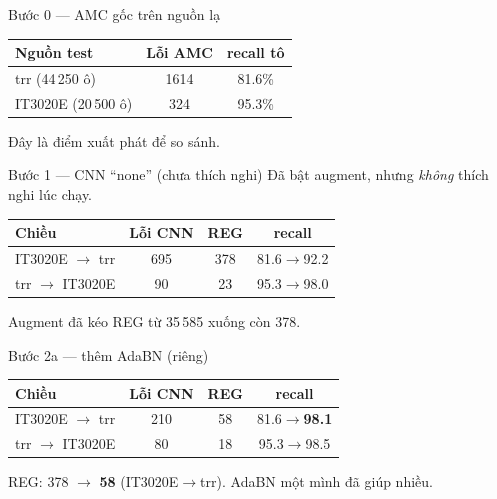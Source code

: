 \documentclass{beamer}
\newcommand{\hl}[1]{\textbf{#1}}
\begin{document}
\begin{frame}{Bước 0 --- AMC gốc trên nguồn lạ}
\begin{center}
\begin{tabular}{|l|c|c|}
\hline
\textbf{Nguồn test} & \textbf{Lỗi AMC} & \textbf{recall tô} \\
\hline
trr (44\,250 ô) & 1614 & 81.6\% \\
\hline
IT3020E (20\,500 ô) & 324 & 95.3\% \\
\hline
\end{tabular}
\end{center}
\vspace{0.3cm}
Đây là điểm xuất phát để so sánh.
\end{frame}

\begin{frame}{Bước 1 --- CNN ``none'' (chưa thích nghi)}
{\footnotesize Đã bật augment, nhưng \emph{không} thích nghi lúc chạy.}
\begin{center}
\begin{tabular}{|l|c|c|c|}
\hline
\textbf{Chiều} & \textbf{Lỗi CNN} & \textbf{REG} & \textbf{recall} \\
\hline
IT3020E $\to$ trr & 695 & 378 & 81.6$\to$92.2 \\
\hline
trr $\to$ IT3020E & 90 & 23 & 95.3$\to$98.0 \\
\hline
\end{tabular}
\end{center}
\vspace{0.2cm}
{\footnotesize Augment đã kéo REG từ 35\,585 xuống còn 378.}
\end{frame}

\begin{frame}{Bước 2a --- thêm AdaBN (riêng)}
\begin{center}
\begin{tabular}{|l|c|c|c|}
\hline
\textbf{Chiều} & \textbf{Lỗi CNN} & \textbf{REG} & \textbf{recall} \\
\hline
IT3020E $\to$ trr & 210 & 58 & 81.6$\to$\hl{98.1} \\
\hline
trr $\to$ IT3020E & 80 & 18 & 95.3$\to$98.5 \\
\hline
\end{tabular}
\end{center}
\vspace{0.2cm}
REG: 378 $\to$ \hl{58} (IT3020E$\to$trr). AdaBN một mình đã giúp nhiều.
\end{frame}
\end{document}
